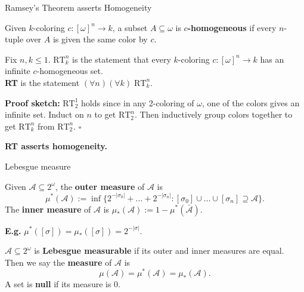 \begin{frame}{Ramsey's Theorem asserts Homogeneity}
  \begin{define*}[$c$-homogeneous]
    Given $k$-coloring $c:[\omega]^n\rightarrow k$, a subset
    $A\subseteq\omega$ is \textbf{$c$-homogeneous} if every $n$-tuple over
    $A$ is given the same color by $c$.
  \end{define*}

  \vspace{0.5em}
  \begin{thm*}[Ramsey's]
    Fix $n,k\leq1$. \textbf{$\text{RT}_k^n$} is the statement that every
    $k$-coloring $c:[\omega]^n\rightarrow k$ has an infinite
    $c$-homogeneous set.\\
    \vspace{0.5em}
    \textbf{RT} is the statement $(\forall n)(\forall k)\; \text{RT}_k^n$.
  \end{thm*}
  \textbf{Proof sketch:} $\text{RT}_2^1$ holds since in any 2-coloring of
  $\omega$, one of the colors gives an infinite set. Induct on $n$ to get
  $\text{RT}_2^n$. Then inductively group colors together to get
  $\text{RT}_k^n$ from $\text{RT}_2^n$. $\square$

  \vspace{0.5em}
  \textbf{RT asserts homogeneity.}
\end{frame}

\begin{frame}{Lebesgue measure}
  \begin{define*}
    Given $\mathcal{A}\subseteq2^\omega$, the \textbf{outer measure} of
    $\mathcal{A}$ is
    \[\mu^*(\mathcal{A}):= \inf\{2^{-|\sigma_0|}+\ldots+2^{-|\sigma_n|}:
    [\sigma_0]\cup\ldots\cup[\sigma_n] \supseteq \mathcal{A}\}.\]
    The \textbf{inner measure} of $\mathcal{A}$ is $\mu_*(\mathcal{A}):=
    1-\mu^*(\bar{\mathcal{A}})$.
  \end{define*}
  \textbf{E.g.} $\mu^*([\sigma]) =\mu_*([\sigma]) =2^{-|\sigma|}$.

  \vspace{0.5em}
  \begin{define*}
    $\mathcal{A}\subseteq2^\omega$ is \textbf{Lebesgue measurable} if its
    outer and inner measures are equal. Then we say the \textbf{measure} of
    $\mathcal{A}$ is
    \[\mu(\mathcal{A}) =\mu^*(\mathcal{A}) =\mu_*(\mathcal{A}).\]
    A set is \textbf{null} if its measure is 0.
  \end{define*}
\end{frame}

